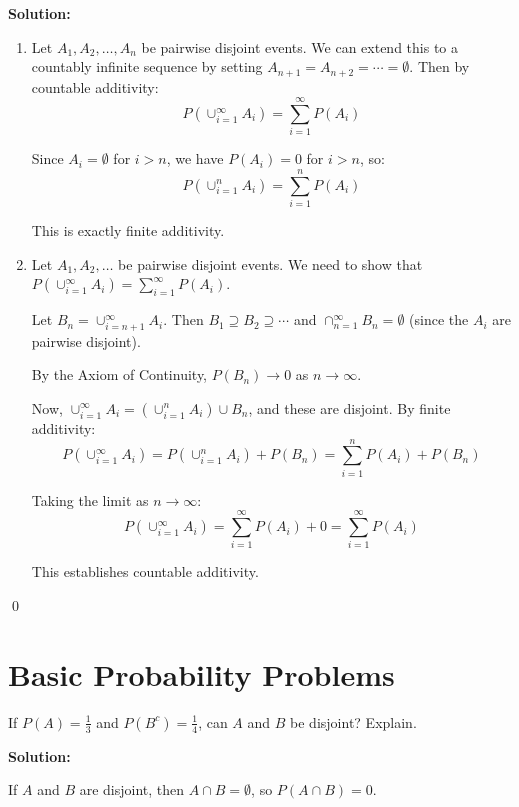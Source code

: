 \noindent\textbf{Solution:}
\begin{enumerate}[label=(\alph*)]
    \item Let $A_1, A_2, \ldots, A_n$ be pairwise disjoint events. We can extend this to a countably infinite sequence by setting $A_{n+1} = A_{n+2} = \cdots = \emptyset$. Then by countable additivity:
    \[ P(\cup_{i=1}^{\infty} A_i) = \sum_{i=1}^{\infty} P(A_i) \]
    
    Since $A_i = \emptyset$ for $i > n$, we have $P(A_i) = 0$ for $i > n$, so:
    \[ P(\cup_{i=1}^{n} A_i) = \sum_{i=1}^{n} P(A_i) \]
    
    This is exactly finite additivity.
    
    \item Let $A_1, A_2, \ldots$ be pairwise disjoint events. We need to show that $P(\cup_{i=1}^{\infty} A_i) = \sum_{i=1}^{\infty} P(A_i)$.
    
    Let $B_n = \cup_{i=n+1}^{\infty} A_i$. Then $B_1 \supseteq B_2 \supseteq \cdots$ and $\cap_{n=1}^{\infty} B_n = \emptyset$ (since the $A_i$ are pairwise disjoint).
    
    By the Axiom of Continuity, $P(B_n) \to 0$ as $n \to \infty$.
    
    Now, $\cup_{i=1}^{\infty} A_i = (\cup_{i=1}^{n} A_i) \cup B_n$, and these are disjoint. By finite additivity:
    \[ P(\cup_{i=1}^{\infty} A_i) = P(\cup_{i=1}^{n} A_i) + P(B_n) = \sum_{i=1}^{n} P(A_i) + P(B_n) \]
    
    Taking the limit as $n \to \infty$:
    \[ P(\cup_{i=1}^{\infty} A_i) = \sum_{i=1}^{\infty} P(A_i) + 0 = \sum_{i=1}^{\infty} P(A_i) \]
    
    This establishes countable additivity.
\end{enumerate}



\qed
\section{Basic Probability Problems}

\begin{problembox}
If $P(A) = \frac{1}{3}$ and $P(B^c) = \frac{1}{4}$, can $A$ and $B$ be disjoint? Explain.
\end{problembox}

\noindent\textbf{Solution:}

If $A$ and $B$ are disjoint, then $A \cap B = \emptyset$, so $P(A \cap B) = 0$.

